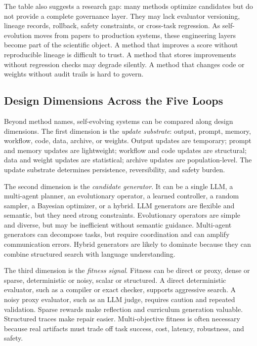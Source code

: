 The table also suggests a research gap: many methods optimize candidates but do not provide a complete governance layer.  They may lack evaluator versioning, lineage records, rollback, safety constraints, or cross-task regression.  As self-evolution moves from papers to production systems, these engineering layers become part of the scientific object.  A method that improves a score without reproducible lineage is difficult to trust.  A method that stores improvements without regression checks may degrade silently.  A method that changes code or weights without audit trails is hard to govern.

\subsection{Design Dimensions Across the Five Loops}
\label{subsec:taxonomy-design-dimensions}

Beyond method names, self-evolving systems can be compared along design dimensions.  The first dimension is the \emph{update substrate}: output, prompt, memory, workflow, code, data, archive, or weights.  Output updates are temporary; prompt and memory updates are lightweight; workflow and code updates are structural; data and weight updates are statistical; archive updates are population-level.  The update substrate determines persistence, reversibility, and safety burden.

The second dimension is the \emph{candidate generator}.  It can be a single LLM, a multi-agent planner, an evolutionary operator, a learned controller, a random sampler, a Bayesian optimizer, or a hybrid.  LLM generators are flexible and semantic, but they need strong constraints.  Evolutionary operators are simple and diverse, but may be inefficient without semantic guidance.  Multi-agent generators can decompose tasks, but require coordination and can amplify communication errors.  Hybrid generators are likely to dominate because they can combine structured search with language understanding.

The third dimension is the \emph{fitness signal}.  Fitness can be direct or proxy, dense or sparse, deterministic or noisy, scalar or structured.  A direct deterministic evaluator, such as a compiler or exact checker, supports aggressive search.  A noisy proxy evaluator, such as an LLM judge, requires caution and repeated validation.  Sparse rewards make reflection and curriculum generation valuable.  Structured traces make repair easier.  Multi-objective fitness is often necessary because real artifacts must trade off task success, cost, latency, robustness, and safety.

